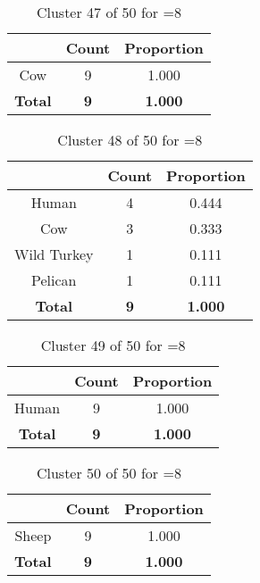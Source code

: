 \begin{table}[ht!]
\centering
\begin{tabular}{|c|c|c|}
\hline
\bf \Spec{} &\bf Count &\bf Proportion\\ \hline \hline
Cow & 9 & 1.000\\ \hline
\hline
\bf Total & \bf 9 & \bf 1.000\\ \hline
\end{tabular}
\label{tab:cluster:47:8}
\caption{Cluster 47 of 50 for \minneigh{}=8}
\end{table}

\begin{table}[ht!]
\centering
\begin{tabular}{|c|c|c|}
\hline
\bf \Spec{} &\bf Count &\bf Proportion\\ \hline \hline
Human & 4 & 0.444\\ \hline
Cow & 3 & 0.333\\ \hline
Wild Turkey & 1 & 0.111\\ \hline
Pelican & 1 & 0.111\\ \hline
\hline
\bf Total & \bf 9 & \bf 1.000\\ \hline
\end{tabular}
\label{tab:cluster:48:8}
\caption{Cluster 48 of 50 for \minneigh{}=8}
\end{table}

\begin{table}[ht!]
\centering
\begin{tabular}{|c|c|c|}
\hline
\bf \Spec{} &\bf Count &\bf Proportion\\ \hline \hline
Human & 9 & 1.000\\ \hline
\hline
\bf Total & \bf 9 & \bf 1.000\\ \hline
\end{tabular}
\label{tab:cluster:49:8}
\caption{Cluster 49 of 50 for \minneigh{}=8}
\end{table}

\clearpage
\begin{table}[ht!]
\centering
\begin{tabular}{|c|c|c|}
\hline
\bf \Spec{} &\bf Count &\bf Proportion\\ \hline \hline
Sheep & 9 & 1.000\\ \hline
\hline
\bf Total & \bf 9 & \bf 1.000\\ \hline
\end{tabular}
\label{tab:cluster:50:8}
\caption{Cluster 50 of 50 for \minneigh{}=8}
\end{table}


